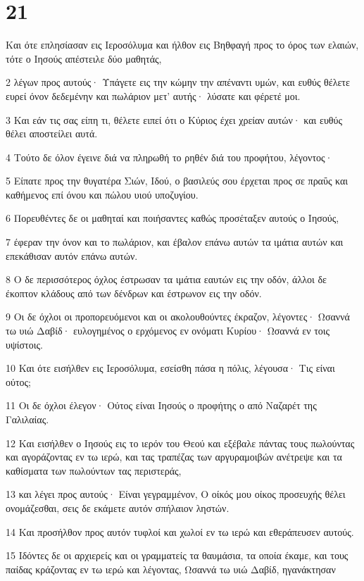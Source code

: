 \chapter{21}

\par Και ότε επλησίασαν εις Ιεροσόλυμα και ήλθον εις Βηθφαγή προς το όρος των ελαιών, τότε ο Ιησούς απέστειλε δύο μαθητάς,
\par 2 λέγων προς αυτούς· Υπάγετε εις την κώμην την απέναντι υμών, και ευθύς θέλετε ευρεί όνον δεδεμένην και πωλάριον μετ' αυτής· λύσατε και φέρετέ μοι.
\par 3 Και εάν τις σας είπη τι, θέλετε ειπεί ότι ο Κύριος έχει χρείαν αυτών· και ευθύς θέλει αποστείλει αυτά.
\par 4 Τούτο δε όλον έγεινε διά να πληρωθή το ρηθέν διά του προφήτου, λέγοντος·
\par 5 Είπατε προς την θυγατέρα Σιών, Ιδού, ο βασιλεύς σου έρχεται προς σε πραΰς και καθήμενος επί όνου και πώλου υιού υποζυγίου.
\par 6 Πορευθέντες δε οι μαθηταί και ποιήσαντες καθώς προσέταξεν αυτούς ο Ιησούς,
\par 7 έφεραν την όνον και το πωλάριον, και έβαλον επάνω αυτών τα ιμάτια αυτών και επεκάθισαν αυτόν επάνω αυτών.
\par 8 Ο δε περισσότερος όχλος έστρωσαν τα ιμάτια εαυτών εις την οδόν, άλλοι δε έκοπτον κλάδους από των δένδρων και έστρωνον εις την οδόν.
\par 9 Οι δε όχλοι οι προπορευόμενοι και οι ακολουθούντες έκραζον, λέγοντες· Ωσαννά τω υιώ Δαβίδ· ευλογημένος ο ερχόμενος εν ονόματι Κυρίου· Ωσαννά εν τοις υψίστοις.
\par 10 Και ότε εισήλθεν εις Ιεροσόλυμα, εσείσθη πάσα η πόλις, λέγουσα· Τις είναι ούτος;
\par 11 Οι δε όχλοι έλεγον· Ούτος είναι Ιησούς ο προφήτης ο από Ναζαρέτ της Γαλιλαίας.
\par 12 Και εισήλθεν ο Ιησούς εις το ιερόν του Θεού και εξέβαλε πάντας τους πωλούντας και αγοράζοντας εν τω ιερώ, και τας τραπέζας των αργυραμοιβών ανέτρεψε και τα καθίσματα των πωλούντων τας περιστεράς,
\par 13 και λέγει προς αυτούς· Είναι γεγραμμένον, Ο οίκός μου οίκος προσευχής θέλει ονομάζεσθαι, σεις δε εκάμετε αυτόν σπήλαιον ληστών.
\par 14 Και προσήλθον προς αυτόν τυφλοί και χωλοί εν τω ιερώ και εθεράπευσεν αυτούς.
\par 15 Ιδόντες δε οι αρχιερείς και οι γραμματείς τα θαυμάσια, τα οποία έκαμε, και τους παίδας κράζοντας εν τω ιερώ και λέγοντας, Ωσαννά τω υιώ Δαβίδ, ηγανάκτησαν
